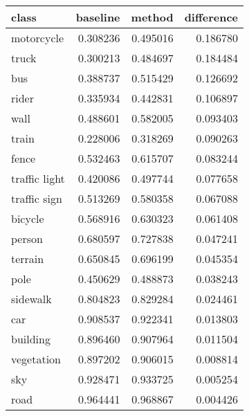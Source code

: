 \begin{tabular}{lrrr}
\toprule
class & baseline & method & difference \\
\midrule
motorcycle & 0.308236 & 0.495016 & 0.186780 \\
truck & 0.300213 & 0.484697 & 0.184484 \\
bus & 0.388737 & 0.515429 & 0.126692 \\
rider & 0.335934 & 0.442831 & 0.106897 \\
wall & 0.488601 & 0.582005 & 0.093403 \\
train & 0.228006 & 0.318269 & 0.090263 \\
fence & 0.532463 & 0.615707 & 0.083244 \\
traffic light & 0.420086 & 0.497744 & 0.077658 \\
traffic sign & 0.513269 & 0.580358 & 0.067088 \\
bicycle & 0.568916 & 0.630323 & 0.061408 \\
person & 0.680597 & 0.727838 & 0.047241 \\
terrain & 0.650845 & 0.696199 & 0.045354 \\
pole & 0.450629 & 0.488873 & 0.038243 \\
sidewalk & 0.804823 & 0.829284 & 0.024461 \\
car & 0.908537 & 0.922341 & 0.013803 \\
building & 0.896460 & 0.907964 & 0.011504 \\
vegetation & 0.897202 & 0.906015 & 0.008814 \\
sky & 0.928471 & 0.933725 & 0.005254 \\
road & 0.964441 & 0.968867 & 0.004426 \\
\bottomrule
\end{tabular}
